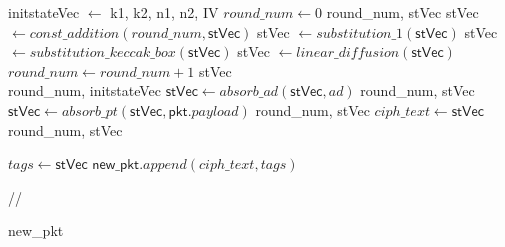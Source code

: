 \begin{algorithm} [t!]
\caption{\texttt{\sysname encryption flow}, \textit{Input:} Ingress encrypted packet \textsf{pkt}, Keys \textsf{k1, k2} configured by control plane into MATs, Nonces \textsf{n1, n2}, Associated data \textsf{ad}, \textit{Output:} \textsf{new\_pkt} 
}
    \begin{algorithmic} [1]
        \State \textsf{initstateVec} $\gets$ \textsf{k1, k2, n1, n2, IV}
        \State $round\_num \gets 0$
         {round\_num, \textsf{stVec}}
                \State \textsf{stVec} $\gets const\_addition(round\_num, \textsf{stVec})$
                \State \textsf{stVec} $\gets substitution\_1(\textsf{stVec})$
                \State \textsf{stVec} $\gets substitution\_keccak\_box(\textsf{stVec})$
                \State \textsf{stVec} $\gets linear\_diffusion(\textsf{stVec})$
                \State $round\_num \gets round\_num + 1$
                \State \Return \textsf{stVec}
        \EndProcedure
        \\

         
            \State {} {round\_num, \textsf{initstateVec}} 
                \State $\textsf{stVec} \gets absorb\_ad(\textsf{stVec}, ad)$
                \State {} {round\_num, \textsf{stVec}}
                \State $\textsf{stVec} \gets absorb\_pt(\textsf{stVec}, \textsf{pkt}.payload)$
                \State {} {round\_num, \textsf{stVec}}
                \State $ciph\_text \gets \textsf{stVec}$
                \State {} {round\_num, \textsf{stVec}}
        
        \Else {}
                \State $tags \gets \textsf{stVec}$
                \State $\textsf{new\_pkt}.append(ciph\_text, tags) $
                
        \EndIf
        //
        
        \State {} {\textsf{new\_pkt}}
    \end{algorithmic}
    \label{alg:pipeline}
\end{algorithm}

